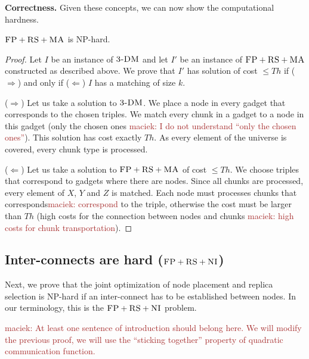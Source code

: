 \documentclass[9pt]{sigcomm-alternate}
\newcommand{\maciek}[1]{\textcolor{brown}{maciek: #1}}
\newcommand{\CC}{\textsc{NI}}
\newcommand{\FP}{\textsc{FP}}
\newcommand{\RS}{\textsc{RS}}
\newcommand{\MA}{\textsc{MA}}
\newcommand{\TDM}{\textsc{3-DM}}
\newcommand{\Thr}{\ensuremath{Th}}
\begin{document}
\textbf{Correctness.}
Given these concepts, we can now show the computational hardness.
\begin{theorem}
$\FP+\RS+\MA$ is NP-hard.
\end{theorem}
\begin{proof}
Let $I$ be an instance of $\TDM$ and let $I'$ be an instance of
$\FP+\RS+\MA$ constructed as described above.
We prove that $I'$ has solution of cost $\leq \Thr$ if ($\Rightarrow$) and only if
($\Leftarrow$)
$I$ has a matching of size $k$.

($\Rightarrow$) Let us take a solution to $\TDM$. We place a node in every
gadget that corresponds to the chosen triples. We match every chunk in a
gadget to a node in this gadget (only the chosen ones \maciek{I do not understand ``only the chosen ones''}). This solution has
cost exactly $\Thr$. As every element of the universe is covered, every
chunk type is processed.

($\Leftarrow$) Let us take a solution to $\FP+\RS+\MA$ of cost $\leq \Thr$. We
choose triples that correspond to gadgets where there are nodes. Since
all chunks are processed, every element of $X$, $Y$ and $Z$ is matched. Each
node must processes chunks that corresponds\maciek{correspond} to the triple, otherwise the
cost must be larger than $\Thr$ (high costs for the connection between
nodes and chunks \maciek{high costs for chunk transportation}).
\end{proof}


\subsection{Inter-connects are hard ($\FP+\RS+\CC$)}\label{ssec:fprscc}


Next, we prove that the joint optimization of node placement and replica selection
is NP-hard if an inter-connect has to be established between nodes.
In our terminology, this is the $\FP+\RS+\CC$ problem.

\maciek{At least one sentence of introduction should belong here. We will modify the previous proof, we will use the ``sticking together'' property of quadratic communication function.}
  
\end{document}
